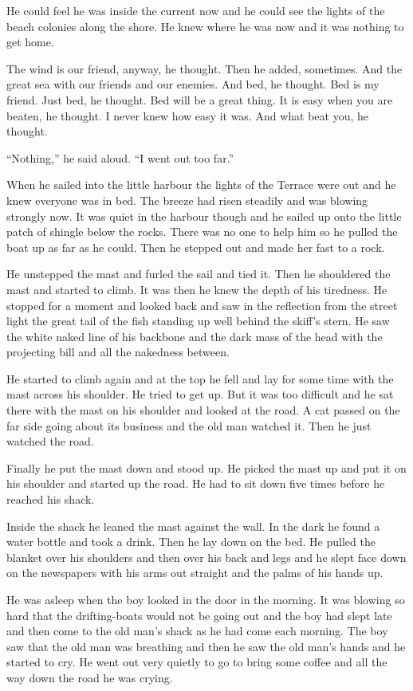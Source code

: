 \documentclass[fontset=ubuntu,zihao=-4]{ctexrep}
\begin{document}
He could feel he was inside the current now and he could see the lights of
the beach \gls{colonies} along the shore. He knew where he was now and it
was nothing to get home.

The wind is our friend, anyway, he thought. Then he \gls{added},
sometimes. And the great sea with our friends and our enemies. And bed, he
thought. Bed is my friend. Just bed, he thought. Bed will be a great thing.
It is easy when you are beaten, he thought. I never knew how easy it was.
And what beat you, he thought.

``Nothing,'' he said aloud. ``I went out too far.''

When he sailed into the little harbour the lights of the Terrace were out
and he knew everyone was in bed. The breeze had risen steadily and was
blowing strongly now. It was quiet in the harbour though and he sailed up
onto the little patch of \gls{shingle} below the \glspl{rock}. There was no
one to help him so he pulled the boat up as far as he could. Then he stepped
out and made her fast to a rock.

He unstepped the mast and furled the sail and tied it. Then he shouldered
the mast and started to climb. It was then he knew the depth of his
\gls{tiredness}. He stopped for a moment and looked back and saw in the
reflection from the street light the great tail of the fish standing up well
behind the skiff's stern. He saw the white naked line of his backbone and
the dark mass of the head with the projecting bill and all the
\gls{nakedness} between.

He started to climb again and at the top he fell and lay for some time with
the mast across his shoulder. He tried to get up. But it was too difficult
and he sat there with the mast on his shoulder and looked at the road. A
cat passed on the far side going about its business and the old man watched
it. Then he just watched the road.

Finally he put the mast down and stood up. He picked the mast up and put it
on his shoulder and started up the road. He had to sit down five times
before he reached his shack.

Inside the shack he leaned the mast against the wall. In the dark he found a
water bottle and took a drink. Then he lay down on the bed. He pulled the
blanket over his shoulders and then over his back and legs and he slept face
down on the newspapers with his arms out straight and the palms of his hands
up.

He was asleep when the boy looked in the door in the morning. It was
blowing so hard that the drifting-boats would not be going out and the boy
had slept late and then come to the old man's shack as he had come each
morning. The boy saw that the old man was breathing and then he saw the old
man's hands and he started to cry. He went out very quietly to go to bring
some coffee and all the way down the road he was crying.
\end{document}
